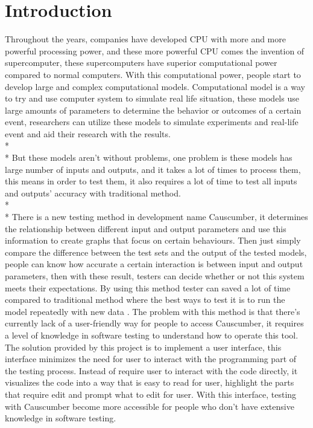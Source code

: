 \chapter{Introduction}

Throughout the years, companies have developed CPU with more and more powerful processing power, and these more powerful CPU comes the invention of supercomputer, these supercomputers have superior computational power compared to normal computers. With this computational power, people start to develop large and complex computational models. Computational model is a way to try and use computer system to simulate real life situation, these models use large amounts of parameters to determine the behavior or outcomes of a certain event, researchers can utilize these models to simulate experiments and real-life event \cite{Reference1} and aid their research with the results.\\*\\*
But these models aren’t without problems, one problem is these models has large number of inputs and outputs, and it takes a lot of times to process them, this means in order to test them, it also requires a lot of time to test all inputs and outputs’ accuracy with traditional method. \\*\\*
There is a new testing method in development name Causcumber, it determines the relationship between different input and output parameters and use this information to create graphs that focus on certain behaviours. Then just simply compare the difference between the test sets and the output of the tested models, people can know how accurate a certain interaction is between input and output parameters, then with these result, testers can decide whether or not this system meets their expectations. By using this method tester can saved a lot of time compared to traditional method where the best ways to test it is to run the model repeatedly with new data \cite{Reference2}. 
The problem with this method is that there’s currently lack of a user-friendly way for people to access Causcumber, it requires a level of knowledge in software testing to understand how to operate this tool. The solution provided by this project is to implement a user interface, this interface minimizes the need for user to interact with the programming part of the testing process. Instead of require user to interact with the code directly, it visualizes the code into a way that is easy to read for user, highlight the parts that require edit and prompt what to edit for user. With this interface, testing with Causcumber become more accessible for people who don’t have extensive knowledge in software testing.


